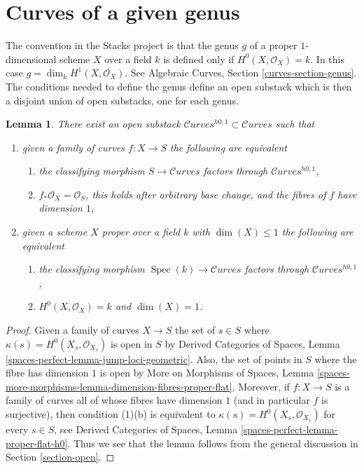 \documentclass{stacks-project}
\theoremstyle{plain}
\newtheorem{lemma}[subsection]{Lemma}
\theoremstyle{definition}
\theoremstyle{remark}
\numberwithin{equation}{subsection}
\def\Spec{\mathop{\mathrm{Spec}}}
\def\Curvesstack{\mathcal{C}\!\mathit{urves}}
\begin{document}
\section{Curves of a given genus}
\label{section-genus}

\noindent
The convention in the Stacks project is that the genus $g$ of a
proper $1$-dimensional scheme $X$ over a field $k$ is defined only
if $H^0(X, \mathcal{O}_X) = k$. In this case
$g = \dim_k H^1(X, \mathcal{O}_X)$.
See Algebraic Curves, Section \ref{curves-section-genus}.
The conditions needed to define the genus define an open substack
which is then a disjoint union of open substacks, one for each genus.

\begin{lemma}
\label{lemma-pre-genus-curves}
There exist an open substack $\Curvesstack^{h0, 1} \subset \Curvesstack$
such that
\begin{enumerate}
\item given a family of curves $f : X \to S$ the following are equivalent
\begin{enumerate}
\item the classifying morphism $S \to \Curvesstack$ factors
through $\Curvesstack^{h0, 1}$,
\item $f_*\mathcal{O}_X = \mathcal{O}_S$, this holds
after arbitrary base change, and the fibres of $f$ have dimension $1$,
\end{enumerate}
\item given a scheme $X$ proper over a field $k$ with $\dim(X) \leq 1$
the following are equivalent
\begin{enumerate}
\item the classifying morphism $\Spec(k) \to \Curvesstack$ factors
through $\Curvesstack^{h0, 1}$,
\item $H^0(X, \mathcal{O}_X) = k$ and $\dim(X) = 1$.
\end{enumerate}
\end{enumerate}
\end{lemma}

\begin{proof}
Given a family of curves $X \to S$ the set of $s \in S$ where
$\kappa(s) = H^0(X_s, \mathcal{O}_{X_s})$
is open in $S$ by Derived Categories of Spaces, Lemma
\ref{spaces-perfect-lemma-jump-loci-geometric}.
Also, the set of points in $S$ where the fibre has
dimension $1$ is open by More on Morphisms of Spaces, Lemma
\ref{spaces-more-morphisms-lemma-dimension-fibres-proper-flat}.
Moreover, if $f : X \to S$ is a family of curves all of whose fibres
have dimension $1$ (and in particular $f$ is surjective), then
condition (1)(b) is equivalent to
$\kappa(s) = H^0(X_s, \mathcal{O}_{X_s})$ for every $s \in S$, see
Derived Categories of Spaces, Lemma \ref{spaces-perfect-lemma-proper-flat-h0}.
Thus we see that the lemma follows from the general discussion in
Section \ref{section-open}.
\end{proof}
\end{document}
